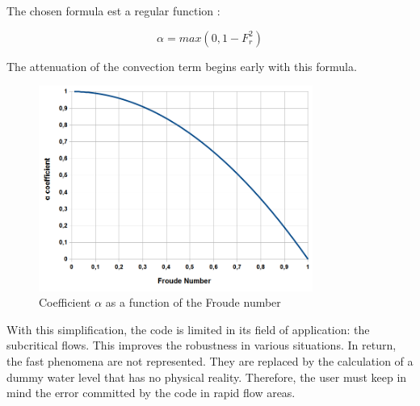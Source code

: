 The chosen formula est a regular function \cite{GUINOT10} :

\begin{equation}
   \alpha = max(0,1-F_{r}^{2})
\end{equation}

The attenuation of the convection term begins early with this formula.

\begin{figure}[H]
 \begin{center}
  \includegraphics[width=0.8\textwidth]{Figures/Atten_Alpha.png}
  \caption{Coefficient $\alpha$ as a function of the Froude number}
 \end{center}
\end{figure}

With this simplification, the code \REZO{} is limited in its field of application: the subcritical flows.
This improves the robustness in various situations. In return, the fast phenomena are not represented. They are replaced by the calculation of a dummy water level that has no physical reality.
Therefore, the user must keep in mind the error committed by the code in rapid flow areas.
